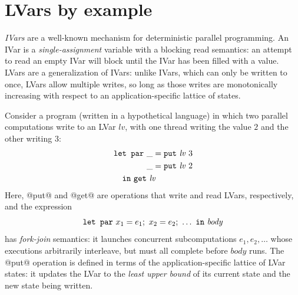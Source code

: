 \section{LVars by example}\label{s:lvars-examples}

\emph{IVars} \cite{IStructures, id, CnC, monad-par} are a well-known
mechanism for deterministic parallel programming.  An IVar is a
\emph{single-assignment} variable \cite{Tesler-1968} with a blocking
read semantics: an attempt to read an empty IVar will block until the
IVar has been filled with a value.  LVars are a generalization of
IVars: unlike IVars, which can only be written to once, LVars allow
multiple writes, so long as those writes are monotonically increasing
with respect to an application-specific lattice of states.

Consider a program (written in a hypothetical language) in which two
parallel computations write to an LVar $\mathit{lv}$, with one thread
writing the value $2$ and the other writing $3$:
\begin{equation}
\begin{split}
& \LETPAR ~\_ = \putexp{\mathit{lv}}{3} \\
&  \letparspace ~\_ = \putexp{\mathit{lv}}{2} \\
&  \letspace \IN~ \GET~\mathit{lv}
\end{split}
\label{e:lvar-example-1}
\end{equation}
Here, @put@ and @get@ are operations that write and read LVars,
respectively, and the expression
\begin{displaymath}
\mbox{\texttt{\mbox{\texttt{let}}~\mbox{\texttt{par}}}}~x_1=e_1;~x_2=e_2;~\dots~\mbox{\texttt{in}}~\mathit{body}
\end{displaymath}
has \emph{fork-join} semantics: it launches concurrent subcomputations
$e_1, e_2, \dots$ whose executions arbitrarily interleave, but must
all complete before $\mathit{body}$ runs.  The @put@ operation is
defined in terms of the application-specific lattice of LVar states:
it updates the LVar to the \emph{least upper bound} of its current
state and the new state being written.

